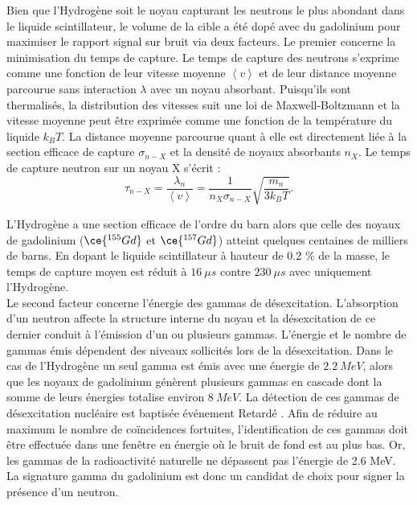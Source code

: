 Bien que l'Hydrogène soit le noyau capturant les neutrons le plus abondant dans le liquide scintillateur, le volume de la cible a été dopé avec du gadolinium pour maximiser le rapport signal sur bruit via deux facteurs. Le premier concerne la minimisation du temps de capture. Le temps de capture des neutrons s'exprime comme une fonction de leur vitesse moyenne $\left<v\right>$ et de leur distance moyenne parcourue sans interaction $\lambda$ avec un noyau absorbant. Puisqu'ils sont thermalisés, la distribution des vitesses suit une loi de Maxwell-Boltzmann et la vitesse moyenne peut être exprimée comme une fonction de la température du liquide $k_BT$. La distance moyenne parcourue quant à elle est directement liée à la section efficace de capture $\sigma_{n-X}$ et la densité de noyaux absorbants $n_{X}$. Le temps de capture neutron sur un noyau X s'écrit :\\ 

\begin{equation} 
\label{eq:neutron_capture_time} 
\tau_{n-X} = \frac{\lambda_n}{\left<v\right>} = \frac{1}{n_{X}\sigma_{n-X}} \sqrt{\frac{m_n}{3 k_B T}}.
\end{equation} 

\bigbreak 

L'Hydrogène a une section efficace de l'ordre du barn alors que celle des noyaux de gadolinium ($\ce{^{155}Gd}$ et $\ce{^{157}Gd}$) atteint quelques centaines de milliers de barns. En dopant le liquide scintillateur à hauteur de 0.2 \% de la masse, le temps de capture moyen est réduit à $\SI{16}{\mu s}$ contre $\SI{230}{\mu s}$ avec uniquement l'Hydrogène.\\ 

Le second facteur concerne l'énergie des gammas de désexcitation. L'absorption d'un neutron affecte la structure interne du noyau et la désexcitation de ce dernier conduit à l'émission d'un ou plusieurs gammas. L'énergie et le nombre de gammas émis dépendent des niveaux sollicités lors de la désexcitation. Dans le cas de l'Hydrogène un seul gamma est émis avec une énergie de $\SI{2.2}{MeV}$, alors que les noyaux de gadolinium génèrent plusieurs gammas en cascade dont la somme de leurs énergies totalise environ $\SI{8}{MeV}$. La détection de ces gammas de désexcitation nucléaire est baptisée événement \og Retardé \fg{}. Afin de réduire au maximum le nombre de coïncidences fortuites, l'identification de ces gammas doit être effectuée dans une fenêtre en énergie où le bruit de fond est au plus bas. Or, les gammas de la radioactivité naturelle ne dépassent pas l'énergie de 2.6 MeV. La signature gamma du gadolinium est donc un candidat de choix pour signer la présence d'un neutron.\\ 

